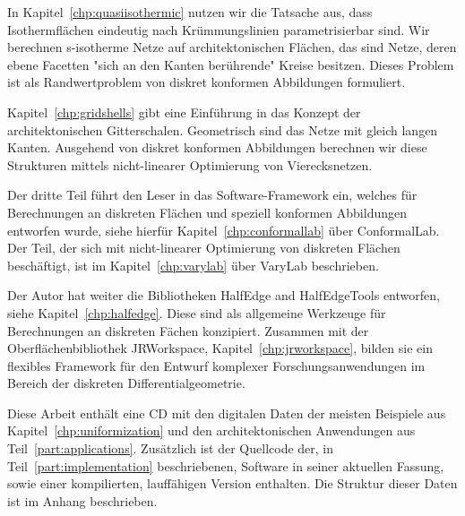 \documentclass[Thesis.tex]{subfiles}
\begin{document}
In Kapitel~\ref{chp:quasiisothermic} nutzen wir die Tatsache aus, dass Isothermfl\"{a}chen eindeutig nach Kr\"{u}mmungslinien parametrisierbar sind.
Wir berechnen s-isotherme Netze auf architektonischen Fl\"{a}chen, das sind Netze, deren ebene Facetten "sich an den Kanten ber\"{u}hrende" Kreise besitzen.
Dieses Problem ist als Randwertproblem von diskret konformen Abbildungen formuliert.

Kapitel~\ref{chp:gridshells} gibt eine Einf\"{u}hrung in das Konzept der architektonischen Gitterschalen.
Geometrisch sind das Netze mit gleich langen Kanten.
Ausgehend von diskret konformen Abbildungen berechnen wir diese Strukturen mittels nicht-linearer Optimierung von Vierecksnetzen.

Der dritte Teil f\"{u}hrt den Leser in das Software-Framework ein, welches f\"{u}r Berechnungen an diskreten Fl\"{a}chen und speziell konformen Abbildungen entworfen wurde, siehe hierf\"{u}r Kapitel~\ref{chp:conformallab} \"{u}ber {\sc ConformalLab}.
Der Teil, der sich mit nicht-linearer Optimierung von diskreten Fl\"{a}chen besch\"{a}ftigt, ist im Kapitel~\ref{chp:varylab} \"{u}ber {\sc VaryLab} beschrieben.

Der Autor hat weiter die Bibliotheken {\sc HalfEdge} and {\sc HalfEdgeTools} entworfen, siehe Kapitel~\ref{chp:halfedge}.
Diese sind als allgemeine Werkzeuge f\"ur Berechnungen an diskreten F\"{a}chen konzipiert.
Zusammen mit der Oberfl\"{a}chenbibliothek {\sc JRWorkspace}, Kapitel~\ref{chp:jrworkspace}, bilden sie ein flexibles Framework f\"{u}r den Entwurf komplexer Forschungsanwendungen im Bereich der diskreten Differentialgeometrie.

Diese Arbeit enth\"{a}lt eine CD mit den digitalen Daten der meisten Beispiele aus Kapitel~\ref{chp:uniformization} und den architektonischen Anwendungen aus Teil~\ref{part:applications}.
Zus\"{a}tzlich ist der Quellcode der, in Teil~\ref{part:implementation} beschriebenen, Software in seiner aktuellen Fassung, sowie einer kompilierten, lauff\"{a}higen Version enthalten.
Die Struktur dieser Daten ist im Anhang beschrieben.

\subfilebibliography
\end{document}

